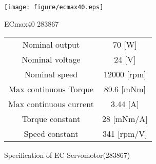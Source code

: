 \documentclass[a4paper,12pt]{article_vdlab_sotsuron}
\begin{document}
\vspace*{10mm}
\begin{figure}[htp]
  \begin{minipage}{0.4\textwidth}
    \begin{center}
      \texttt{[image: figure/ecmax40.eps]}
      \vspace*{3mm}
      \caption{ECmax40 283867}
      \label{fig:ecmax40}
    \end{center}
  \end{minipage}
  \begin{minipage}{0.6\textwidth}
      \begin{center}
	\makeatletter
	\def\@captype{table}   
	\makeatother
	\caption{Specification of EC Servomotor(283867)}
	\label{tab:ecmax40}
	  \begin{tabular}{cc}\hline
	    Nominal output & 70 [W] \\
	    Nominal voltage & 24 [V] \\
	    Nominal speed & 12000 [rpm] \\
	    Max continuous Torque & 89.6 [mNm] \\
	    Max continuous current & 3.44 [A] \\
	    Torque constant & 28 [mNm/A] \\
	    Speed constant & 341 [rpm/V] \\\hline 
	  \end{tabular}  
	\end{center}
  \end{minipage}
\end{figure}
\end{document}
